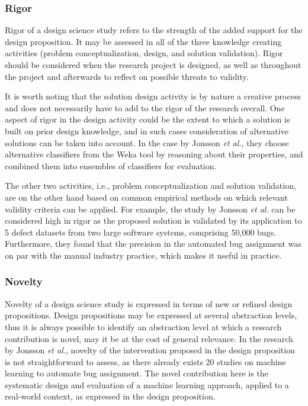 \documentclass[graybox]{svmult}
\begin{document}
\subsubsection{Rigor} 
Rigor of a design science study refers to the strength of the added support for the design proposition. It may be assessed in all of the three knowledge creating activities (problem conceptualization, design, and solution validation). 
Rigor should be considered when the research project is designed, as well as throughout the project and afterwards to reflect on possible threats to validity. 

It is worth noting that the solution design activity is by nature a creative process and does not necessarily have to add to the rigor of the research overall. One aspect of rigor in the design activity could be the extent to which a solution is built on prior design knowledge, and in such cases consideration of alternative solutions can be taken into account. 
In the case by Jonsson \emph{et al.}, they choose alternative classifiers from the Weka tool by reasoning about their properties, and combined them into ensembles of classifiers for evaluation.

The other two activities, i.e., problem conceptualization and solution validation, are on the other hand based on common empirical methods on which relevant validity criteria can be applied. For example, the study by Jonsson \emph{et al.} can be considered high in rigor as the proposed solution is validated by its application to 5 defect datasets from two large software systems, comprising 50,000 bugs.  Furthermore, they found that the precision in the automated bug assignment was on par with the manual industry practice, which makes it useful in practice.

\subsubsection{Novelty } 
Novelty of a design science study is expressed in terms of new or refined design propositions. Design propositions may be expressed at several abstraction levels, thus it is always possible to identify an abstraction level at which a research contribution is novel, may it be at the cost of general relevance.  In the research by Jonsson \emph{et al.}, novelty of the intervention proposed in the design proposition is not straightforward to assess, as there already exists 20 studies on machine learning to automate bug assignment. The novel contribution here is the systematic design and evaluation of a machine learning approach, applied to a real-world context, as expressed in the design proposition.
\end{document}
